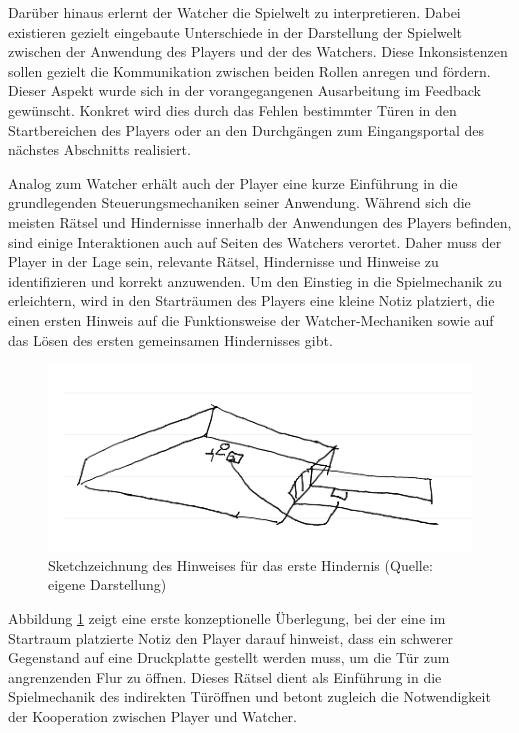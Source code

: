 Darüber hinaus erlernt der Watcher die Spielwelt zu interpretieren. Dabei existieren gezielt eingebaute Unterschiede in der Darstellung der Spielwelt zwischen der Anwendung des Players und der des Watchers. Diese Inkonsistenzen sollen gezielt die Kommunikation zwischen beiden Rollen anregen und fördern. Dieser Aspekt wurde sich in der vorangegangenen Ausarbeitung im Feedback gewünscht. Konkret wird dies durch das Fehlen bestimmter Türen in den Startbereichen des Players oder an den Durchgängen zum Eingangsportal des nächstes Abschnitts realisiert.

Analog zum Watcher erhält auch der Player eine kurze Einführung in die grundlegenden Steuerungsmechaniken seiner Anwendung. Während sich die meisten Rätsel und Hindernisse innerhalb der Anwendungen des Players befinden, sind einige Interaktionen auch auf Seiten des Watchers verortet. Daher muss der Player in der Lage sein, relevante Rätsel, Hindernisse und Hinweise zu identifizieren und korrekt anzuwenden. Um den Einstieg in die Spielmechanik zu erleichtern, wird in den Starträumen des Players eine kleine Notiz platziert, die einen ersten Hinweis auf die Funktionsweise der Watcher-Mechaniken sowie auf das Lösen des ersten gemeinsamen Hindernisses gibt.

\begin{figure}[ht]
\centering
\includegraphics[width=1\linewidth]{content/pictures/Startroom_Sketch.png}
\caption{Sketchzeichnung des Hinweises für das erste Hindernis (Quelle: eigene Darstellung)}
\label{fig:sketch-startriddle}
\end{figure}

Abbildung \ref{fig:sketch-startriddle} zeigt eine erste konzeptionelle Überlegung, bei der eine im Startraum platzierte Notiz den Player darauf hinweist, dass ein schwerer Gegenstand auf eine Druckplatte gestellt werden muss, um die Tür zum angrenzenden Flur zu öffnen. Dieses Rätsel dient als Einführung in die Spielmechanik des indirekten Türöffnen und betont zugleich die Notwendigkeit der Kooperation zwischen Player und Watcher.

